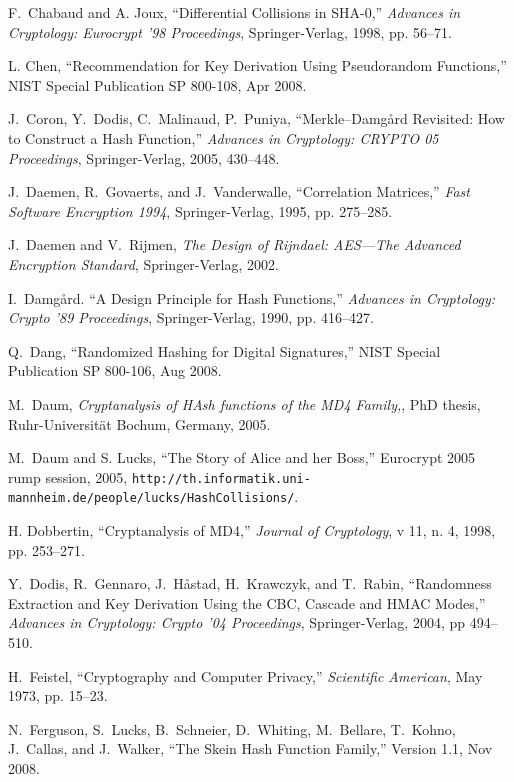 \documentclass[11pt,twoside]{article}
\begin{document}
{\begin{thebibliography}{19}
 F.~Chabaud and A. Joux, ``Differential Collisions in SHA-0,'' {\it Advances in Cryptology: Eurocrypt '98 Proceedings}, Springer-Verlag, 1998, pp. 56--71.

 L. Chen, ``Recommendation for Key Derivation Using Pseudorandom Functions,'' NIST Special Publication SP 800-108, Apr 2008.

 J.~Coron, Y.~Dodis, C.~Malinaud, P.~Puniya, ``{Merkle--Damg{\aa}rd} Revisited: How to Construct a Hash Function,'' {\it Advances in Cryptology: CRYPTO 05 Proceedings}, Springer-Verlag, 2005,  430--448.

 J.~Daemen, R.~Govaerts, and J.~Vanderwalle, ``Correlation Matrices,'' {\it Fast Software Encryption 1994}, Springer-Verlag, 1995, pp. 275--285.

 J.~Daemen and V.~Rijmen, {\it The Design of Rijndael: AES---The Advanced Encryption Standard}, Springer-Verlag, 2002.

 I.~Damg{\aa}rd. ``A Design Principle for Hash Functions,'' {\it Advances in Cryptology: Crypto '89 Proceedings}, Springer-Verlag, 1990, pp. 416--427.

 Q.~Dang, ``Randomized Hashing for Digital Signatures,'' NIST Special Publication SP 800-106, Aug 2008.

 M.~Daum, {\it Cryptanalysis of HAsh functions of the MD4
    Family,}, PhD thesis, Ruhr-Universit\"at Bochum, Germany, 2005. 

 M.~Daum and S. Lucks, ``The Story of Alice and her Boss,'' Eurocrypt 2005 rump session, 2005,  \texttt{http://th.informatik.uni-mannheim.de/people/lucks/HashCollisions/}.

 H. Dobbertin, ``Cryptanalysis of MD4,'' {\it Journal of Cryptology}, v 11, n. 4, 1998, pp. 253--271.

 Y.~Dodis, R.~Gennaro, J.~H{\aa}stad, H.~Krawczyk, and T.~Rabin, ``Randomness Extraction and Key Derivation Using the CBC, Cascade and HMAC Modes,'' {\it Advances in Cryptology: Crypto '04 Proceedings}, Springer-Verlag, 2004, pp 494--510.

 H.~Feistel, ``Cryptography and Computer Privacy,'' {\it Scientific American}, May 1973, pp. 15--23.

 N.~Ferguson, S.~Lucks, B.~Schneier, D.~Whiting, M.~Bellare, T.~Kohno, J.~Callas, and J.~Walker, ``The Skein Hash Function Family,'' Version 1.1, Nov 2008.


\end{thebibliography}}
\end{document}

